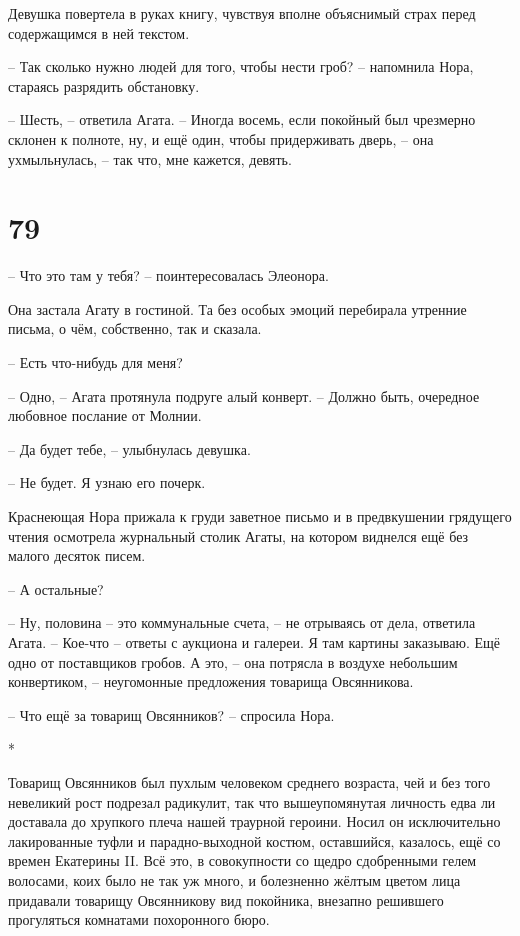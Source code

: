 \documentclass[
  a5paperpaper,
  DIV=11,
  numbers=noendperiod]{scrreprt}
\begin{document}
Девушка повертела в руках книгу, чувствуя вполне объяснимый страх перед
содержащимся в ней текстом.

-- Так сколько нужно людей для того, чтобы нести гроб? -- напомнила
Нора, стараясь разрядить обстановку.

-- Шесть, -- ответила Агата. -- Иногда восемь, если покойный был
чрезмерно склонен к полноте, ну, и ещё один, чтобы придерживать дверь,
-- она ухмыльнулась, -- так что, мне кажется, девять.

\section*{79}\label{79}


-- Что это там у тебя? -- поинтересовалась Элеонора.

Она застала Агату в гостиной. Та без особых эмоций перебирала утренние
письма, о чём, собственно, так и сказала.

-- Есть что-нибудь для меня?

-- Одно, -- Агата протянула подруге алый конверт. -- Должно быть,
очередное любовное послание от Молнии.

-- Да будет тебе, -- улыбнулась девушка.

-- Не будет. Я узнаю его почерк.

Краснеющая Нора прижала к груди заветное письмо и в предвкушении
грядущего чтения осмотрела журнальный столик Агаты, на котором виднелся
ещё без малого десяток писем.

-- А остальные?

-- Ну, половина -- это коммунальные счета, -- не отрываясь от дела,
ответила Агата. -- Кое-что -- ответы с аукциона и галереи. Я там картины
заказываю. Ещё одно от поставщиков гробов. А это, -- она потрясла в
воздухе небольшим конвертиком, -- неугомонные предложения товарища
Овсянникова.

-- Что ещё за товарищ Овсянников? -- спросила Нора.

*

Товарищ Овсянников был пухлым человеком среднего возраста, чей и без
того невеликий рост подрезал радикулит, так что вышеупомянутая личность
едва ли доставала до хрупкого плеча нашей траурной героини. Носил он
исключительно лакированные туфли и парадно-выходной костюм, оставшийся,
казалось, ещё со времен Екатерины II. Всё это, в совокупности со щедро
сдобренными гелем волосами, коих было не так уж много, и болезненно
жёлтым цветом лица придавали товарищу Овсянникову вид покойника,
внезапно решившего прогуляться комнатами похоронного бюро.
\end{document}
